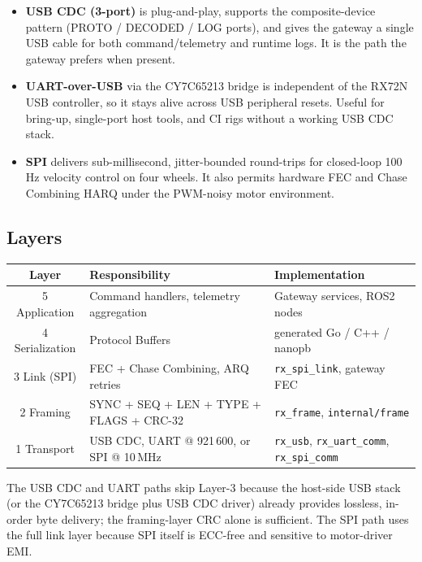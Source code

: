\begin{itemize}
  \item \textbf{USB CDC (3-port)} is plug-and-play, supports the
        composite-device pattern (PROTO / DECODED / LOG ports), and
        gives the gateway a single USB cable for both command/telemetry
        and runtime logs. It is the path the gateway prefers when
        present.
  \item \textbf{UART-over-USB} via the CY7C65213 bridge is independent
        of the RX72N USB controller, so it stays alive across USB
        peripheral resets. Useful for bring-up, single-port host tools,
        and CI rigs without a working USB CDC stack.
  \item \textbf{SPI} delivers sub-millisecond, jitter-bounded
        round-trips for closed-loop 100\,Hz velocity control on four
        wheels. It also permits hardware FEC and Chase Combining HARQ
        under the PWM-noisy motor environment.
\end{itemize}

\subsection{Layers}

\begin{center}
\begin{tabular}{|c|l|l|}
\hline
\textbf{Layer} & \textbf{Responsibility}                                 & \textbf{Implementation} \\
\hline
5 Application  & Command handlers, telemetry aggregation                  & Gateway services, ROS2 nodes \\
4 Serialization& Protocol Buffers                                         & generated Go / C++ / nanopb \\
3 Link (SPI)   & FEC + Chase Combining, ARQ retries                       & \texttt{rx\_spi\_link}, gateway FEC \\
2 Framing      & SYNC + SEQ + LEN + TYPE + FLAGS + CRC-32                 & \texttt{rx\_frame}, \texttt{internal/frame} \\
1 Transport    & USB CDC, UART @ 921\,600, or SPI @ 10\,MHz                & \texttt{rx\_usb}, \texttt{rx\_uart\_comm}, \texttt{rx\_spi\_comm} \\
\hline
\end{tabular}
\end{center}

The USB CDC and UART paths skip Layer-3 because the host-side USB stack
(or the CY7C65213 bridge plus USB CDC driver) already provides
lossless, in-order byte delivery; the framing-layer CRC alone is
sufficient. The SPI path uses the full link layer because SPI itself
is ECC-free and sensitive to motor-driver EMI.

